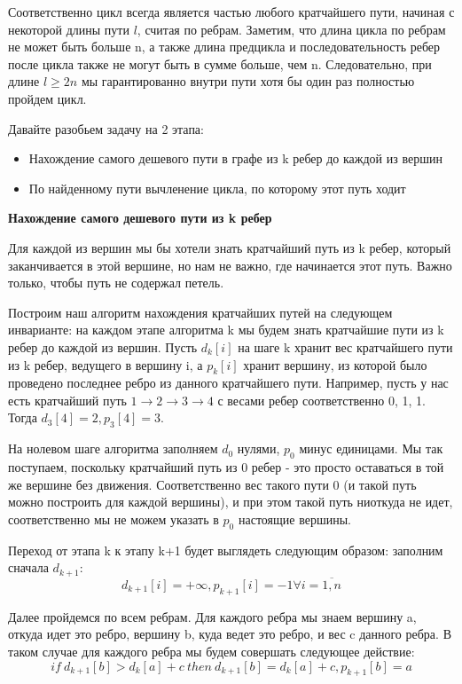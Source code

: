 \documentclass[a4paper,12pt]{article}
\begin{document}
 Соответственно цикл всегда является частью любого кратчайшего пути, начиная с некоторой длины пути $l$, считая по ребрам. Заметим, что длина цикла по ребрам не может быть больше n, а также длина предцикла и последовательность ребер после цикла также не могут быть в сумме больше, чем n. Следовательно, при длине $l \ge 2n$ мы гарантированно внутри пути хотя бы один раз полностью пройдем цикл.

Давайте разобьем задачу на 2 этапа:

\begin{itemize}
\item Нахождение самого дешевого пути в графе из k ребер до каждой из вершин
\item По найденному пути вычленение цикла, по которому этот путь ходит
\end{itemize}

\textbf{Нахождение самого дешевого пути из k ребер}

Для каждой из вершин мы бы хотели знать кратчайший путь из k ребер, который заканчивается в этой вершине, но нам не важно, где начинается этот путь. Важно только, чтобы путь не содержал петель.

Построим наш алгоритм нахождения кратчайших путей на следующем инварианте: на каждом этапе алгоритма k мы будем знать кратчайшие пути из k ребер до каждой из вершин. Пусть $d_k[i]$ на шаге k хранит вес кратчайшего пути из k ребер, ведущего в вершину i, а $p_k[i]$ хранит вершину, из которой было проведено последнее ребро из данного кратчайшего пути. Например, пусть у нас есть кратчайший путь $1 \rightarrow 2 \rightarrow 3 \rightarrow 4$ с весами ребер соответственно 0, 1, 1. Тогда $d_3[4] = 2, p_3[4] = 3$. 

На нолевом шаге алгоритма заполняем $d_0$ нулями, $p_0$ минус единицами. Мы так поступаем, поскольку кратчайший путь из 0 ребер - это просто оставаться в той же вершине без движения. Соответственно вес такого пути 0 (и такой путь можно построить для каждой вершины), и при этом такой путь ниоткуда не идет, соответственно мы не можем указать в $p_0$ настоящие вершины.

Переход от этапа k к этапу k+1 будет выглядеть следующим образом: заполним сначала $d_{k+1}$:
 $$d_{k+1}[i] = +\infty, p_{k+1}[i] = -1  \forall i = \overline{1,n}$$

Далее пройдемся по всем ребрам. Для каждого ребра мы знаем вершину a, откуда идет это ребро, вершину b, куда ведет это ребро, и вес c данного ребра. В таком случае для каждого ребра мы будем совершать следующее действие:
$$if~ d_{k+1}[b] > d_{k}[a] + c~ then~ d_{k+1}[b] = d_{k}[a] + c, p_{k+1}[b] = a$$
\end{document}
